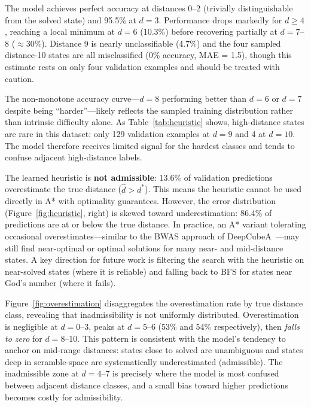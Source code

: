 \documentclass[11pt]{article}
\begin{document}
The model achieves perfect accuracy at distances 0--2 (trivially distinguishable
from the solved state) and 95.5\% at $d = 3$. Performance drops markedly for
$d \geq 4$, reaching a local minimum at $d = 6$ (10.3\%) before recovering
partially at $d = 7$--8 ($\approx$30\%). Distance 9 is nearly unclassifiable
(4.7\%) and the four sampled distance-10 states are all misclassified (0\% accuracy,
MAE = 1.5), though this estimate rests on only four validation examples and
should be treated with caution.

The non-monotone accuracy curve---$d=8$ performing better than $d=6$ or $d=7$
despite being ``harder''---likely reflects the sampled training distribution
rather than intrinsic difficulty alone. As Table~\ref{tab:heuristic} shows, high-distance
states are rare in this dataset: only 129 validation examples at $d = 9$ and
4 at $d = 10$. The model therefore receives limited signal for the hardest
classes and tends to confuse adjacent high-distance labels.

The learned heuristic is \textbf{not admissible}: 13.6\% of validation predictions
overestimate the true distance ($\hat{d} > d^*$). This means the heuristic
cannot be used directly in A* with optimality guarantees. However, the error
distribution (Figure~\ref{fig:heuristic}, right) is skewed toward underestimation:
86.4\% of predictions are at or below the true distance. In practice, an A*
variant tolerating occasional overestimates---similar to the BWAS approach of
DeepCubeA~\cite{agostinelli2019deepcubea}---may still find near-optimal or
optimal solutions for many near- and mid-distance states.
A key direction for future work is filtering the search with the heuristic on
near-solved states (where it is reliable) and falling back to BFS for states
near God's number (where it fails).

Figure~\ref{fig:overestimation} disaggregates the overestimation rate by true
distance class, revealing that inadmissibility is not uniformly distributed.
Overestimation is negligible at $d = 0$--3, peaks at $d = 5$--6 (53\% and 54\%
respectively), then \emph{falls to zero} for $d = 8$--10. This pattern is
consistent with the model's tendency to anchor on mid-range distances: states
close to solved are unambiguous and states deep in scramble-space are
systematically underestimated (admissible). The inadmissible zone at $d = 4$--7
is precisely where the model is most confused between adjacent distance classes,
and a small bias toward higher predictions becomes costly for admissibility.
\end{document}
